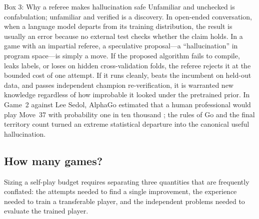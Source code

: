 \begin{explainer}{Box 3: Why a referee makes hallucination safe}\label{box:hallucination}
Unfamiliar and unchecked is confabulation; unfamiliar and verified is a discovery. In open-ended conversation, when a language model departs from its training distribution, the result is usually an error because no external test checks whether the claim holds. In a game with an impartial referee, a speculative proposal---a ``hallucination'' in program space---is simply a move. If the proposed algorithm fails to compile, leaks labels, or loses on hidden cross-validation folds, the referee rejects it at the bounded cost of one attempt. If it runs cleanly, beats the incumbent on held-out data, and passes independent champion re-verification, it is warranted new knowledge regardless of how improbable it looked under the pretrained prior. In Game~2 against Lee Sedol, AlphaGo estimated that a human professional would play Move~37 with probability one in ten thousand \citep{silver2016mastering,metz2016twomoves}; the rules of Go and the final territory count turned an extreme statistical departure into the canonical useful hallucination.
\end{explainer}

\subsection{How many games?}\label{sub:price-games}\label{subsec:how-many-games}

Sizing a self-play budget requires separating three quantities that are frequently conflated: the attempts needed to find a single improvement, the experience needed to train a transferable player, and the independent problems needed to evaluate the trained player.

